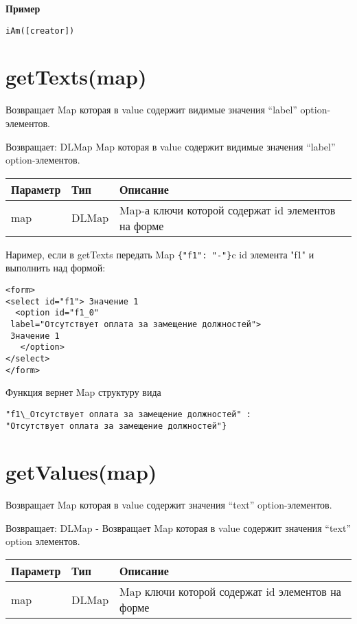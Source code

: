 \textbf{Пример}

\begin{verbatim}
iAm([creator])
\end{verbatim}

\hypertarget{gettextsmap-dlmap}{%
\section{getTexts(map)}\label{gettextsmap-dlmap}}

Возвращает Map которая в value содержит видимые значения ``label''
option-элементов.

Возвращает: DLMap Map которая в value содержит
видимые значения ``label'' option-элементов.

\begin{longtable}[]{@{}lll@{}}
\toprule
Параметр & Тип & Описание\tabularnewline
\midrule
\endhead
map & DLMap & Map-а ключи которой содержат id элементов на
форме\tabularnewline
\bottomrule
\end{longtable}

Наример, если в getTexts передать Map \verb|{"f1": "-"}|c id элемента "f1" и выполнить над формой:

\begin{verbatim}
<form>
<select id="f1"> Значение 1
  <option id="f1_0"
 label="Отсутствует оплата за замещение должностей">
 Значение 1
   </option>
</select>
</form>
\end{verbatim}

Функция вернет Map структуру вида
\begin{verbatim}
"f1\_Отсутствует оплата за замещение должностей" :
"Отсутствует оплата за замещение должностей"}
\end{verbatim}

\hypertarget{getvaluesmap-dlmap}{%
\section{getValues(map) }\label{getvaluesmap-dlmap}}

Возвращает Map которая в value содержит значения ``text''
option-элементов.

Возвращает: DLMap - Возвращает Map которая в value содержит
значения ``text'' option элементов.

\begin{longtable}[]{@{}lll@{}}
\toprule
Параметр & Тип & Описание\tabularnewline
\midrule
\endhead
map & DLMap & Map ключи которой содержат id элементов на
форме\tabularnewline
\bottomrule
\end{longtable}

